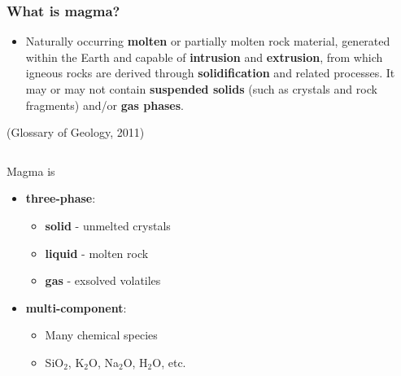 \documentclass{beamer}
\begin{document}
\begin{frame}
  \frametitle{What is magma?}

  \begin{itemize}
  \item Naturally occurring \textbf{molten} or partially molten rock material, generated within the Earth and capable of \textbf{intrusion} and \textbf{extrusion}, from which igneous rocks are derived through \textbf{solidification} and related processes. It may or may not contain \textbf{suspended solids} (such as crystals and rock fragments) and/or \textbf{gas phases}.
  \end{itemize}

  \hfill (Glossary of Geology, 2011)

  \begin{columns}

    \begin{column}{0.45\paperwidth}

      \vspace{-1cm}

      Magma is
      \begin{itemize}
      \item \textbf{three-phase}:
        
        \begin{itemize}
        \item \textbf{solid} - unmelted crystals \\
        \item \textbf{liquid} - molten rock      \\
        \item \textbf{gas} - exsolved volatiles  \\
        \end{itemize}
        
      \item \textbf{multi-component}:
        
        \begin{itemize}
        \item Many chemical species \\
        \item SiO$_{2}$, K$_{2}$O, Na$_{2}$O, H$_{2}$O, etc.
        \end{itemize}
        
      \end{itemize}

    \end{column}


\end{columns}
\end{frame}
\end{document}
